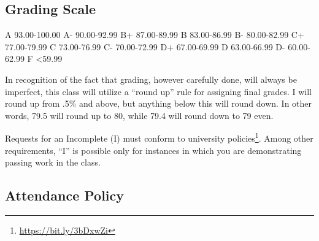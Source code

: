 \documentclass[
  letterpaper,
  DIV=11,
  numbers=noendperiod]{scrartcl}
\DeclareRobustCommand{\href}[2]{#2\footnote{\url{#1}}}
\begin{document}
\hypertarget{grading-scale}{%
\subsection{Grading Scale}\label{grading-scale}}

A 93.00-100.00 \textbar{} A- 90.00-92.99 B+ 87.00-89.99 \textbar{} B
83.00-86.99 \textbar{} B- 80.00-82.99 C+ 77.00-79.99 \textbar{} C
73.00-76.99 \textbar{} C- 70.00-72.99 D+ 67.00-69.99 \textbar{} D
63.00-66.99 \textbar{} D- 60.00-62.99 F \textless59.99

\begin{tcolorbox}[enhanced jigsaw, colbacktitle=quarto-callout-note-color!10!white, rightrule=.15mm, opacityback=0, colframe=quarto-callout-note-color-frame, leftrule=.75mm, breakable, bottomrule=.15mm, arc=.35mm, opacitybacktitle=0.6, title=\textcolor{quarto-callout-note-color}{\faInfo}\hspace{0.5em}{Note}, titlerule=0mm, toptitle=1mm, bottomtitle=1mm, left=2mm, toprule=.15mm, colback=white, coltitle=black]

In recognition of the fact that grading, however carefully done, will
always be imperfect, this class will utilize a ``round up'' rule for
assigning final grades. I will round up from .5\% and above, but
anything below this will round down. In other words, 79.5 will round up
to 80, while 79.4 will round down to 79 even.

\end{tcolorbox}

\begin{tcolorbox}[enhanced jigsaw, colbacktitle=quarto-callout-important-color!10!white, rightrule=.15mm, opacityback=0, colframe=quarto-callout-important-color-frame, leftrule=.75mm, breakable, bottomrule=.15mm, arc=.35mm, opacitybacktitle=0.6, title=\textcolor{quarto-callout-important-color}{\faExclamation}\hspace{0.5em}{Important}, titlerule=0mm, toptitle=1mm, bottomtitle=1mm, left=2mm, toprule=.15mm, colback=white, coltitle=black]

Requests for an Incomplete (I) must conform to
\href{https://bit.ly/3bDxwZi}{university policies}. Among other
requirements, ``I'' is possible only for instances in which you are
demonstrating passing work in the class.

\end{tcolorbox}

\hypertarget{attendance-policy}{%
\subsection{Attendance Policy}\label{attendance-policy}}
\end{document}
